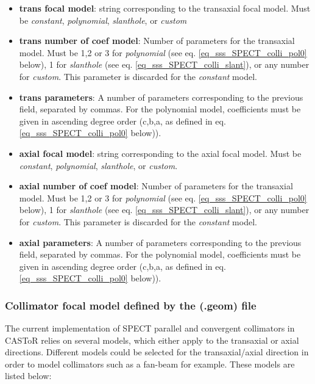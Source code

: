\documentclass[a4paper, 11pt]{article}
\begin{document}
\begin{itemize}
  \item \textbf{trans focal model}: string corresponding to the transaxial focal model. Must be \textit{constant}, \textit{polynomial},
        \textit{slanthole}, or \textit{custom}
  \item \textbf{trans number of coef model}: Number of parameters for the transaxial model. Must be 1,2 or 3 for \textit{polynomial} (see eq. \ref{eq_sss_SPECT_colli_pol0} below),
        1 for \textit{slanthole} (see eq. \ref{eq_sss_SPECT_colli_slant}), or any number for \textit{custom}. This parameter is discarded for the \textit{constant} model.
  \item \textbf{trans parameters}: A number of parameters corresponding to the previous field, separated by commas. For the polynomial model, coefficients must be given in ascending degree order (c,b,a, as defined in eq. \ref{eq_sss_SPECT_colli_pol0} below)).
  \item \textbf{axial focal model}: string corresponding to the axial focal model. Must be \textit{constant}, \textit{polynomial},
        \textit{slanthole}, or \textit{custom}.
  \item \textbf{axial number of coef model}: Number of parameters for the transaxial model. Must be 1,2 or 3 for \textit{polynomial} (see eq. \ref{eq_sss_SPECT_colli_pol0} below),
        1 for \textit{slanthole}  (see eq. \ref{eq_sss_SPECT_colli_slant}), or any number for \textit{custom}. This parameter is discarded for the \textit{constant} model.
  \item \textbf{axial parameters}: A number of parameters corresponding to the previous field, separated by commas. For the polynomial model, coefficients must be given in ascending degree order (c,b,a, as defined in eq. \ref{eq_sss_SPECT_colli_pol0} below)).
\end{itemize}

\subsubsection{Collimator focal model defined by the (.geom) file}
\label{sss_SPECT_conv_colli}

The current implementation of SPECT parallel and convergent collimators in CASToR relies on several models, which either apply to the
transaxial or axial directions. Different models could be selected for the transaxial/axial direction in order to model collimators such
as a fan-beam for example. These models are listed below:
\end{document}
